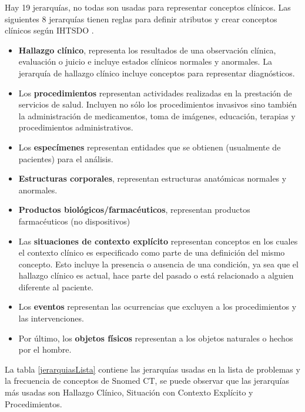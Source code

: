 Hay 19 jerarquías, no todas son usadas para representar conceptos clínicos. Las siguientes 8 jerarquías tienen reglas para definir atributos y crear conceptos clínicos según \acrshort{IHTSDO} \cite{ihtsdo2016EG}.

\begin{itemize}
\item \textbf{Hallazgo clínico}, representa los resultados de una observación clínica, evaluación o juicio e incluye estados clínicos normales y anormales. La jerarquía de hallazgo clínico incluye conceptos para representar diagnósticos.
\item Los \textbf{procedimientos} representan actividades realizadas en la prestación de servicios de salud. Incluyen no sólo los procedimientos invasivos sino también la administración de medicamentos, toma  de imágenes, educación, terapias y procedimientos administrativos.
\item Los \textbf{especímenes} representan entidades que se obtienen (usualmente de pacientes) para el análisis.
\item \textbf{Estructuras corporales}, representan estructuras anatómicas normales y anormales.
\item \textbf{Productos biológicos/farmacéuticos}, representan productos farmacéuticos (no dispositivos)
\item Las \textbf{situaciones de contexto explícito} representan conceptos en los cuales el contexto clínico es especificado como parte de una definición del mismo concepto. Esto incluye la presencia o ausencia de una condición, ya sea que el hallazgo clínico es actual, hace parte del pasado o está relacionado a alguien diferente al paciente.
\item Los \textbf{eventos} representan las ocurrencias que excluyen a los procedimientos y las intervenciones.
\item Por último, los \textbf{objetos físicos }representan a los objetos naturales o hechos por el hombre.
\end{itemize}
 
La tabla \ref{jerarquiasLista} contiene las jerarquías usadas en la lista de problemas y la frecuencia de conceptos de Snomed CT, se puede observar que las jerarquías más usadas son Hallazgo Clínico, Situación con Contexto Explícito y Procedimientos.

